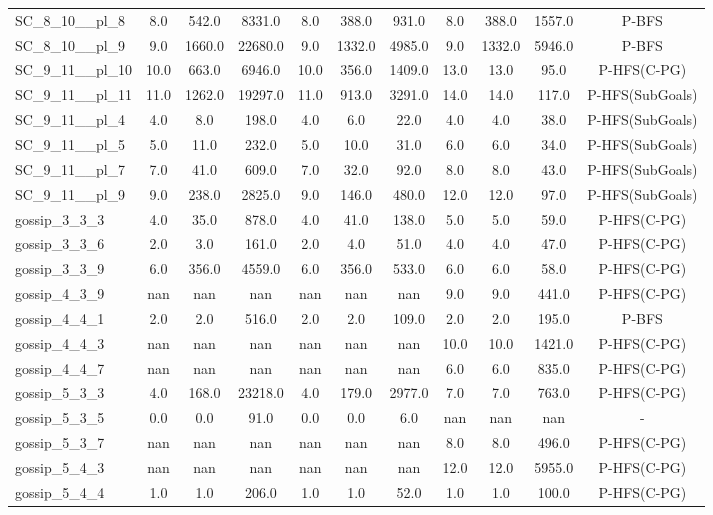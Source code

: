 \begin{table}[!ht]
\begin{tabular}{l|ccc|ccc|cccc}
SC\_8\_10\_\_pl\_8 & 8.0 & 542.0 & 8331.0 & 8.0 & 388.0 & 931.0 & 8.0 & 388.0 & 1557.0 & P-BFS \\
SC\_8\_10\_\_pl\_9 & 9.0 & 1660.0 & 22680.0 & 9.0 & 1332.0 & 4985.0 & 9.0 & 1332.0 & 5946.0 & P-BFS \\
SC\_9\_11\_\_pl\_10 & 10.0 & 663.0 & 6946.0 & 10.0 & 356.0 & 1409.0 & 13.0 & 13.0 & 95.0 & P-HFS(C-PG) \\
SC\_9\_11\_\_pl\_11 & 11.0 & 1262.0 & 19297.0 & 11.0 & 913.0 & 3291.0 & 14.0 & 14.0 & 117.0 & P-HFS(SubGoals) \\
SC\_9\_11\_\_pl\_4 & 4.0 & 8.0 & 198.0 & 4.0 & 6.0 & 22.0 & 4.0 & 4.0 & 38.0 & P-HFS(SubGoals) \\
SC\_9\_11\_\_pl\_5 & 5.0 & 11.0 & 232.0 & 5.0 & 10.0 & 31.0 & 6.0 & 6.0 & 34.0 & P-HFS(SubGoals) \\
SC\_9\_11\_\_pl\_7 & 7.0 & 41.0 & 609.0 & 7.0 & 32.0 & 92.0 & 8.0 & 8.0 & 43.0 & P-HFS(SubGoals) \\
SC\_9\_11\_\_pl\_9 & 9.0 & 238.0 & 2825.0 & 9.0 & 146.0 & 480.0 & 12.0 & 12.0 & 97.0 & P-HFS(SubGoals) \\
gossip\_3\_3\_3 & 4.0 & 35.0 & 878.0 & 4.0 & 41.0 & 138.0 & 5.0 & 5.0 & 59.0 & P-HFS(C-PG) \\
gossip\_3\_3\_6 & 2.0 & 3.0 & 161.0 & 2.0 & 4.0 & 51.0 & 4.0 & 4.0 & 47.0 & P-HFS(C-PG) \\
gossip\_3\_3\_9 & 6.0 & 356.0 & 4559.0 & 6.0 & 356.0 & 533.0 & 6.0 & 6.0 & 58.0 & P-HFS(C-PG) \\
gossip\_4\_3\_9 & nan & nan & nan & nan & nan & nan & 9.0 & 9.0 & 441.0 & P-HFS(C-PG) \\
gossip\_4\_4\_1 & 2.0 & 2.0 & 516.0 & 2.0 & 2.0 & 109.0 & 2.0 & 2.0 & 195.0 & P-BFS \\
gossip\_4\_4\_3 & nan & nan & nan & nan & nan & nan & 10.0 & 10.0 & 1421.0 & P-HFS(C-PG) \\
gossip\_4\_4\_7 & nan & nan & nan & nan & nan & nan & 6.0 & 6.0 & 835.0 & P-HFS(C-PG) \\
gossip\_5\_3\_3 & 4.0 & 168.0 & 23218.0 & 4.0 & 179.0 & 2977.0 & 7.0 & 7.0 & 763.0 & P-HFS(C-PG) \\
gossip\_5\_3\_5 & 0.0 & 0.0 & 91.0 & 0.0 & 0.0 & 6.0 & nan & nan & nan & - \\
gossip\_5\_3\_7 & nan & nan & nan & nan & nan & nan & 8.0 & 8.0 & 496.0 & P-HFS(C-PG) \\
gossip\_5\_4\_3 & nan & nan & nan & nan & nan & nan & 12.0 & 12.0 & 5955.0 & P-HFS(C-PG) \\
gossip\_5\_4\_4 & 1.0 & 1.0 & 206.0 & 1.0 & 1.0 & 52.0 & 1.0 & 1.0 & 100.0 & P-HFS(C-PG) \\

\end{tabular}
\end{table}
